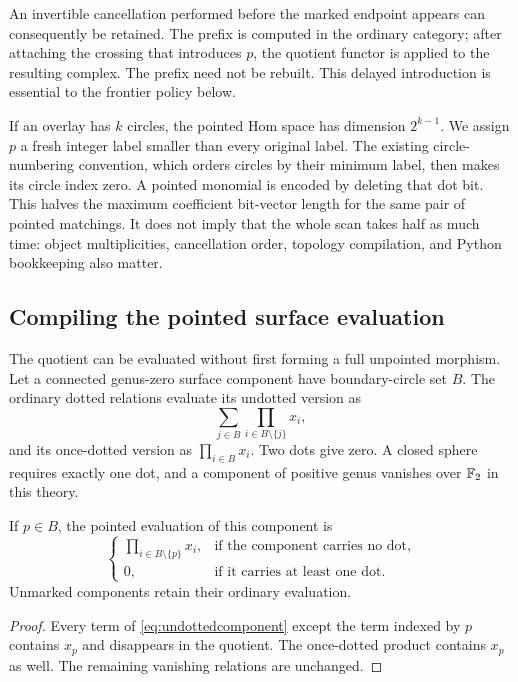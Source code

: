 An invertible cancellation performed before the marked endpoint appears
can consequently be retained.  The prefix is computed in the ordinary
category; after attaching the crossing that introduces $p$, the quotient
functor is applied to the resulting complex.  The prefix need not be rebuilt.
This delayed introduction is essential to the frontier policy below.

If an overlay has $k$ circles, the pointed Hom space has dimension
$2^{k-1}$.  We assign $p$ a fresh integer label smaller than every original
label.  The existing circle-numbering convention, which orders circles by
their minimum label, then makes its circle index zero.  A pointed monomial
is encoded by deleting that dot bit.  This halves the maximum coefficient
bit-vector length for the same pair of pointed matchings.  It does not imply
that the whole scan takes half as much time: object multiplicities,
cancellation order, topology compilation, and Python bookkeeping also matter.

\subsection{Compiling the pointed surface evaluation}

The quotient can be evaluated without first forming a full unpointed
morphism.  Let a connected genus-zero surface component have boundary-circle
set $B$.  The ordinary dotted relations evaluate its undotted version as
\begin{equation}
  \sum_{j\in B}\prod_{i\in B\setminus\{j\}}x_i,
  \label{eq:undottedcomponent}
\end{equation}
and its once-dotted version as $\prod_{i\in B}x_i$.  Two dots give zero.
A closed sphere requires exactly one dot, and a component of positive genus
vanishes over $\mathbb{F}_2$ in this theory.

\begin{lemma}
\label{lem:markedsurface}
If $p\in B$, the pointed evaluation of this component is
\[
 \begin{cases}
  \displaystyle\prod_{i\in B\setminus\{p\}}x_i,
      &\text{if the component carries no dot},\\[4pt]
  0,  &\text{if it carries at least one dot}.
 \end{cases}
\]
Unmarked components retain their ordinary evaluation.
\end{lemma}

\begin{proof}
Every term of \eqref{eq:undottedcomponent} except the term indexed by $p$
contains $x_p$ and disappears in the quotient.  The once-dotted product
contains $x_p$ as well.  The remaining vanishing relations are unchanged.
\end{proof}

